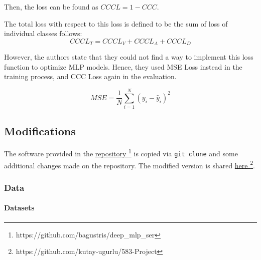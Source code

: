 \documentclass[a4paper,11pt]{article}
\begin{document}
Then, the loss can be found as $CCCL = 1 - CCC$.

The total loss with respect to this loss is defined to be the sum of loss of individual classes follows:
\begin{equation}
    CCCL_T = CCCL_V + CCCL_A + CCCL_D
    \label{eq:CCCLoss}
\end{equation}

However, the authors state that they could not find a way to implement this loss function to optimize MLP models. Hence, they used MSE Loss instead in the training process, and CCC Loss again in the evaluation. 

\begin{equation}
    MSE = \frac{1}{N}\sum_{i=1}^N (y_i -{\hat{y}}_i)^2
\end{equation}

\pagebreak

\subsection{Modifications}

The software provided in the \href{https://github.com/bagustris/deep_mlp_ser}{repository \faExternalLink*} \footnote{https://github.com/bagustris/deep\_mlp\_ser} is copied via \texttt{git clone} and some additional changes made on the repository. The modified version is shared \href{https://github.com/kutay-ugurlu/583-Project}{here \faExternalLink*} \footnote{ https://github.com/kutay-ugurlu/583-Project}.

\subsubsection{Data}\label{subsec:MELDdata}

\paragraph{Datasets}
\end{document}
